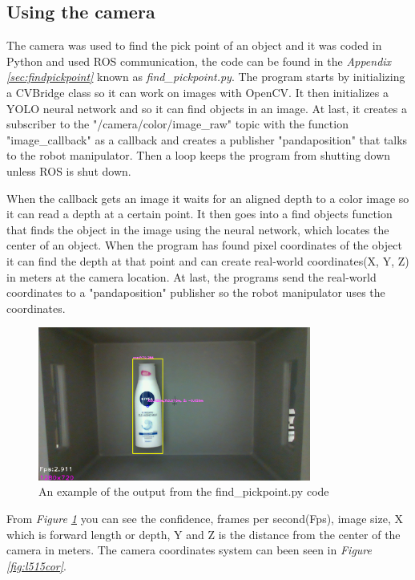 \subsection{Using the camera}\label{camera}
The camera was used to find the pick point of an object and it was coded in Python and used ROS communication, the code can be found in the \textit{Appendix \ref{sec:findpickpoint}} known as \textit{find\_pickpoint.py}. 
The program starts by initializing a CVBridge class so it can work on images with OpenCV. It then initializes a YOLO neural network and so it can find objects in an image. At last, it creates a subscriber to the "/camera/color/image\_raw" topic with the function "image\_callback" as a callback and creates a publisher "pandaposition" that talks to the robot manipulator. Then a loop keeps the program from shutting down unless ROS is shut down.

When the callback gets an image it waits for an aligned depth to a color image so it can read a depth at a certain point. It then goes into a find objects function that finds the object in the image using the neural network, which locates the center of an object. When the program has found pixel coordinates of the object it can find the depth at that point and can create real-world coordinates(X, Y, Z) in meters at the camera location. At last, the programs send the real-world coordinates to a "pandaposition" publisher so the robot manipulator uses the coordinates.

\begin{figure}[h]
    \centering
    \includegraphics[width=0.8\textwidth]{graphics/findpickpoint.png}
    \caption{An example of the output from the find\_pickpoint.py code}
    \label{fig:findpickpoint}
\end{figure}

From \textit{Figure \ref{fig:findpickpoint}} you can see the confidence, frames per second(Fps), image size, X which is forward length or depth, Y and Z is the distance from the center of the camera in meters. 
The camera coordinates system can been seen in \textit{Figure \ref{fig:l515cor}}.


